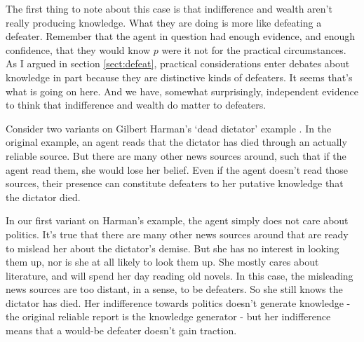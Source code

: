 \documentclass[oneside]{book}
\begin{document}
The first thing to note about this case is that indifference and wealth aren't really producing knowledge. What they are doing is more like defeating a defeater. Remember that the agent in question had enough evidence, and enough confidence, that they would know $p$ were it not for the practical circumstances. As I argued in section \ref{sect:defeat}, practical considerations enter debates about knowledge in part because they are distinctive kinds of defeaters. It seems that's what is going on here. And we have, somewhat surprisingly, independent evidence to think that indifference and wealth do matter to defeaters.

Consider two variants on Gilbert Harman's `dead dictator' example \citep[75]{Harman1973}. In the original example, an agent reads that the dictator has died through an actually reliable source. But there are many other news sources around, such that if the agent read them, she would lose her belief. Even if the agent doesn't read those sources, their presence can constitute defeaters to her putative knowledge that the dictator died.

In our first variant on Harman's example, the agent simply does not care about politics. It's true that there are many other news sources around that are ready to mislead her about the dictator's demise. But she has no interest in looking them up, nor is she at all likely to look them up. She mostly cares about literature, and will spend her day reading old novels. In this case, the misleading news sources are too distant, in a sense, to be defeaters. So she still knows the dictator has died. Her indifference towards politics doesn't generate knowledge - the original reliable report is the knowledge generator - but her indifference means that a would-be defeater doesn't gain traction.
\end{document}
